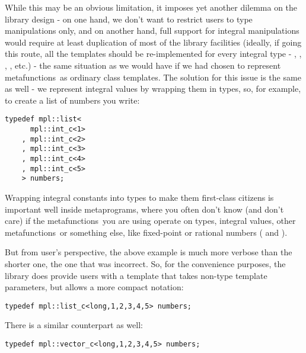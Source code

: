 \documentclass{kapproc}
\newcommand{\mfns}{meta\-func\-tions}
\begin{document}
While this may be an obvious limitation, it imposes yet 
another dilemma on the library design - on one hand, we don't 
want to restrict users to type manipulations only, and on another 
hand, full support for integral manipulations would require at 
least duplication of most of the library facilities (ideally, 
if going this route, all the templates should be re-implemented 
for every integral type - , , ,
, etc.) - the same situation as we would have if we 
had chosen to represent \mfns\ as ordinary class templates.
The solution for this issue is the same as well - we represent 
integral values by wrapping them in types, so, for example, to 
create a list of numbers you write:

{\small
\begin{codesamp}\begin{verbatim}
typedef mpl::list<
      mpl::int_c<1>
    , mpl::int_c<2>
    , mpl::int_c<3>
    , mpl::int_c<4>
    , mpl::int_c<5>
    > numbers;
\end{verbatim}
\end{codesamp}
}

Wrapping integral constants into types to make them 
first-class citizens is important well inside metaprograms, 
where you often don't know (and don't care) if the 
\mfns\ you are using operate on types, integral 
values, other \mfns\, or something else, like 
fixed-point or rational numbers ( 
and ).

But from user's perspective, the above example is much more
verbose than the shorter one, the one that was incorrect. So, 
for the convenience purposes, the library does provide users 
with a template that takes non-type template parameters, but 
allows a more compact notation:

{\small
\begin{codesamp}\begin{verbatim}
typedef mpl::list_c<long,1,2,3,4,5> numbers;
\end{verbatim}
\end{codesamp}
}

There is a similar  counterpart as well:

{\small
\begin{codesamp}\begin{verbatim}
typedef mpl::vector_c<long,1,2,3,4,5> numbers;
\end{verbatim}
\end{codesamp}
}
\end{document}

